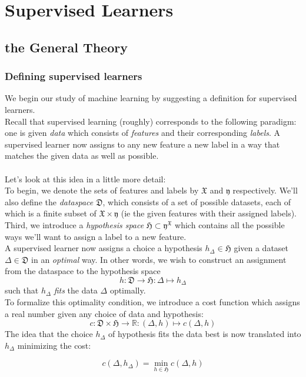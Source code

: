 \documentclass{book}
\theoremstyle{plain}
\theoremstyle{definition}
\renewcommand{\d}[1]{\mathbb{#1}}
\newcommand{\f}[1]{\mathfrak{#1}}
\newcommand{\fun}{\mapsto}
\newcommand{\mor}{\longrightarrow}
\begin{document}
\part{Supervised Learners}
\chapter{the General Theory}
\section{Defining supervised learners}
We begin our study of machine learning by suggesting a definition for supervised learners.\\
Recall that supervised learning (roughly) corresponds to the following paradigm: one is given \emph{data} which consists of \emph{features} and their corresponding \emph{labels}. A supervised learner now assigns to any new feature a new label in a way that matches the given data as well as possible.\\\\
Let's look at this idea in a little more detail:\\ 
To begin, we denote the sets of features and labels by $\f{X}$ and $\f{y}$ respectively. We'll also define the \emph{dataspace} $\f{D}$, which consists of a set of possible datasets, each of which is a finite subset of $\f{X}\times \f{y}$ (ie the given features with their assigned labels). Third, we introduce a \emph{hypothesis space} $\f{H}\subset \f{y}^\f{X}$ which contains all the possible ways we'll want to assign a label to a new feature.\\
A supervised learner now assigns a choice a hypothesis $h_\Delta \in \f{H}$ given a dataset $\Delta \in \f{D}$ in an \emph{optimal} way. In other words, we wish to construct an assignment from the dataspace to the hypothesis space
\[
h:\f{D}\mor \f{H}: \Delta\fun h_\Delta
\]
such that $h_\Delta$ \emph{fits} the data $\Delta$ optimally.\\ To formalize this optimality condition, we introduce a cost function which assigns a real number given any choice of data and hypothesis:
\[c: \f{D}\times \f{H}\mor \d{R}: (\Delta,h)\fun c(\Delta,h) \]
The idea that the choice $h_\Delta$ of hypothesis fits the data best is now translated into $h_\Delta$ minimizing the cost:

\begin{equation} \label{eq:learningcondition}
	c(\Delta,h_\Delta)=\min_{h\in \f{H}} c(\Delta,h)
\end{equation}
\end{document}
